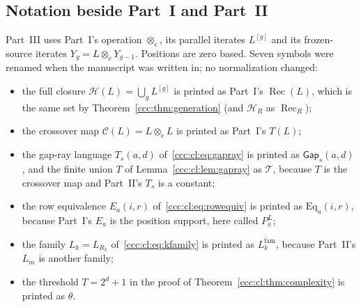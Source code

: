 \documentclass[11pt,letterpaper]{article}
\theoremstyle{definition}
\theoremstyle{remark}
\newcommand{\rec}{\operatorname{Rec}}
\newcommand{\cut}{\otimes_{\mathrm c}}
\newcommand{\gen}[2]{#1^{[#2]}}
\begin{document}
\subsection{Notation beside Part~I and Part~II}\label{ccc:cl:sec:notation}

Part~III uses Part~I's operation $\cut$, its parallel iterates $\gen Lg$ and
its frozen-source iterates $Y_g=L\cut Y_{g-1}$. Positions are zero based.
Seven symbols were renamed when the manuscript was written in; no
normalization changed:
\begin{itemize}[leftmargin=1.4em,itemsep=1pt]
\item the full closure $\mathcal H(L)=\bigcup_g\gen Lg$ is printed as
 Part~I's $\rec(L)$, which is the same set by Theorem~\ref{ccc:thm:generation}
 (and $\mathcal H_R$ as $\rec_R$);
\item the crossover map $\mathcal C(L)=L\cut L$ is printed as Part~I's $T(L)$;
\item the gap-ray language $T_s(a,d)$ of~\eqref{ccc:cl:eq:gapray} is printed as
 $\mathsf{Gap}_s(a,d)$, and the finite union $T$ of
 Lemma~\ref{ccc:cl:lem:gapray} as $\mathcal T$, because $T$ is the crossover
 map and Part~II's $T_s$ is a constant;
\item the row equivalence $E_a(i,r)$ of~\eqref{ccc:cl:eq:rowequiv} is printed as
 $\mathrm{Eq}_a(i,r)$, because Part~I's $E_a$ is the position support, here
 called $P_a^L$;
\item the family $L_k=L_{R_k}$ of~\eqref{ccc:cl:eq:kfamily} is printed as
 $L^{\mathrm{fam}}_k$, because Part~II's $L_m$ is another family;
\item the threshold $T=2^d+1$ in the proof of Theorem~\ref{ccc:cl:thm:complexity}
 is printed as $\theta$.
\end{itemize}
\end{document}
